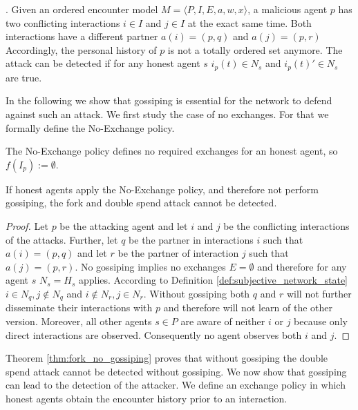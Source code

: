 \begin{defn}. Given an ordered encounter model $M = \langle P, I, E, a, w, x \rangle$, a malicious agent $p$ has two conflicting interactions 
    $i \in I$ and $j \in I$ at the exact same time. Both interactions have a different partner $a(i) = (p, q)$ 
    and $a(j) = (p, r)$ Accordingly, the personal history  of $p$ is not a totally ordered set anymore.
    The attack can be detected if for any honest agent $s$ $i_p(t) \in N_{s}$ and $i_p(t)' \in N_{s}$ are
    true.
\end{defn}

In the following we show that gossiping is essential for the network to defend against such an 
attack. We first study the case of no exchanges. For that we formally define the No-Exchange policy.

\begin{pol}[No-Exchange]
    \label{pol:no-exchange}
    The No-Exchange policy defines no required exchanges for an honest agent, so $f(I_p) := \emptyset$.
\end{pol}


\begin{thm}
    \label{thm:fork_no_gossiping}
    If honest agents apply the No-Exchange policy, and therefore not perform gossiping,
    the fork and double spend attack cannot be detected.
\end{thm}
\begin{proof}
    Let $p$ be the attacking agent and let $i$ and $j$ be the conflicting interactions of the 
    attacks. Further, let $q$ be the partner in interactions $i$ such that $a(i) = (p, q)$ and let 
    $r$ be the partner of interaction $j$ such that $a(j) = (p, r)$. 
    No gossiping implies no exchanges $E = \emptyset$ and therefore for any agent $s$ $N_s = H_s$
    applies. 
    According to Definition \ref{def:subjective_network_state} $i \in N_{q}, j \notin N_{q}$ and 
    $i \notin N_{r}, j \in N_{r}$. Without gossiping both $q$ and $r$ will not further disseminate 
    their interactions with $p$ and therefore will not learn of the other version.
    Moreover, all other agents $s \in P$ are aware of neither $i$ or $j$ because only direct 
    interactions are observed. Consequently no agent observes both $i$ and $j$.
\end{proof}

Theorem \ref{thm:fork_no_gossiping} proves that without gossiping the double spend attack cannot be
detected without gossiping. We now show that gossiping can lead to the detection of the attacker. We
define an exchange policy in which honest agents obtain the encounter history prior to an interaction.

